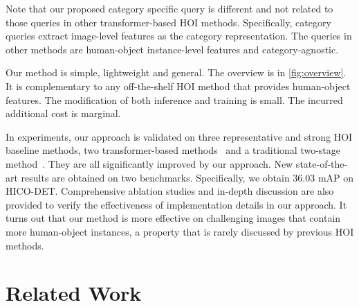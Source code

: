 \documentclass[10pt,twocolumn,letterpaper]{article}
\begin{document}
Note that our proposed category specific query is different and not related to those queries in other transformer-based HOI methods\cite{tamura2021qpic,zou2021end,kim2021hotr,chen2021reformulating}. Specifically, category queries extract image-level features as the category representation. The queries in other methods are human-object instance-level features and category-agnostic.

Our method is simple, lightweight and general. The overview is in \cref{fig:overview}. It is complementary to any off-the-shelf HOI method that provides human-object features. The modification of both inference and training is small. The incurred additional cost is marginal. 

In experiments, our approach is validated on three representative and strong HOI baseline methods, two transformer-based methods~\cite{tamura2021qpic, liao2022gen} and a traditional two-stage method~\cite{zhang2021spatially}. They are all significantly improved by our approach. New state-of-the-art results are obtained on two benchmarks. Specifically, we obtain 36.03 mAP on HICO-DET. Comprehensive ablation studies and in-depth discussion are also provided to verify the effectiveness of implementation details in our approach. It turns out that our method is more effective on challenging images that contain more human-object instances, a property that is rarely discussed by previous HOI methods.


\section{Related Work}
\end{document}
